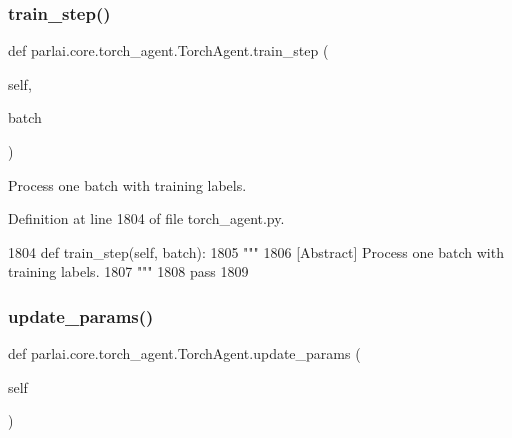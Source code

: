 \mbox{\label{classparlai_1_1core_1_1torch__agent_1_1TorchAgent_a8ba9d535736c0af100d00c5e7b02b61b}} 
\subsubsection{\texorpdfstring{train\+\_\+step()}{train\_step()}}
{\footnotesize\ttfamily def parlai.\+core.\+torch\+\_\+agent.\+Torch\+Agent.\+train\+\_\+step (\begin{DoxyParamCaption}\item[{}]{self,  }\item[{}]{batch }\end{DoxyParamCaption})}

\begin{DoxyVerb}[Abstract] Process one batch with training labels.
\end{DoxyVerb}
 

Definition at line 1804 of file torch\+\_\+agent.\+py.


\begin{DoxyCode}
1804     \textcolor{keyword}{def }train\_step(self, batch):
1805         \textcolor{stringliteral}{"""}
1806 \textcolor{stringliteral}{        [Abstract] Process one batch with training labels.}
1807 \textcolor{stringliteral}{        """}
1808         \textcolor{keywordflow}{pass}
1809 
\end{DoxyCode}
\mbox{\label{classparlai_1_1core_1_1torch__agent_1_1TorchAgent_a7e2c9e180887397daa6229a0f9700b1c}} 
\subsubsection{\texorpdfstring{update\+\_\+params()}{update\_params()}}
{\footnotesize\ttfamily def parlai.\+core.\+torch\+\_\+agent.\+Torch\+Agent.\+update\+\_\+params (\begin{DoxyParamCaption}\item[{}]{self }\end{DoxyParamCaption})}

